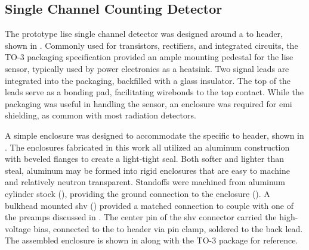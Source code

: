\documentclass[../../../main.tex]{subfiles}
\begin{document}
%
    \subsection{Single Channel Counting Detector}%
    \label{sec:chapter-3:early-designs:single-channel}%
    The prototype \gls{lise} single channel detector was designed around a \gls{to} header, shown in .
    Commonly used for transistors, rectifiers, and integrated circuits, the TO-3 packaging specification provided an ample mounting pedestal for the \gls{lise} sensor, typically used by power electronics as a heatsink.
    Two signal leads are integrated into the packaging, backfilled with a glass insulator.
    The top of the leads serve as a bonding pad, facilitating wirebonds to the top contact.
    While the packaging was useful in handling the sensor, an enclosure was required for \gls{emi} shielding, as common with most radiation detectors.
    \par%
    A simple enclosure was designed to accommodate the specific \gls{to} header, shown in .
    The enclosures fabricated in this work all utilized an aluminum construction with beveled flanges to create a light-tight seal.
    Both softer and lighter than steal, aluminum may be formed into rigid enclosures that are easy to machine and relatively neutron transparent.
    Standoffs were machined from aluminum cylinder stock (), providing the ground connection to the enclosure ().
    A bulkhead mounted \gls{shv} () provided a matched connection to couple with one of the \glspl{preamp} discussed in .
    The center pin of the \gls{shv} connector carried the \gls{high-voltage} bias, connected to the \gls{to} header via pin clamp, soldered to the back lead.
    The assembled enclosure is shown in  along with the TO-3 package for reference.
\end{document}
